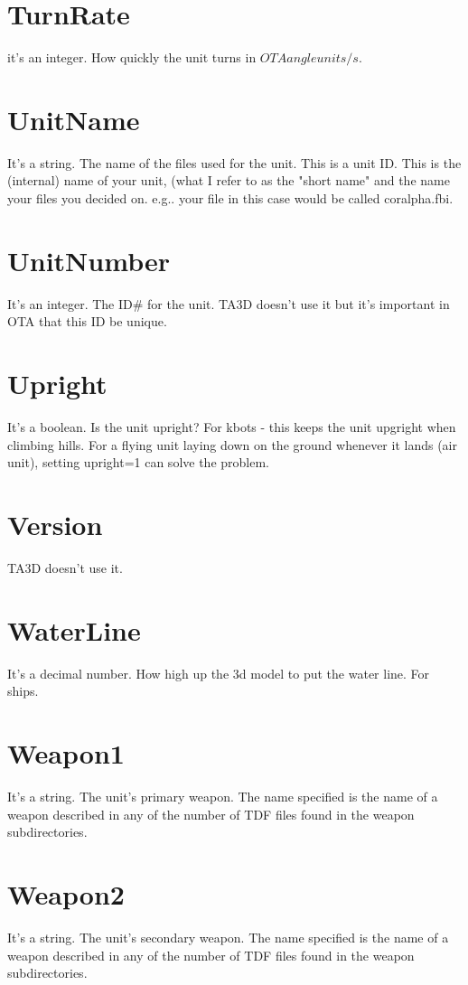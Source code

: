 \documentclass[a4paper,10pt]{article}
\begin{document}
\section{TurnRate}
it's an integer. How quickly the unit turns in $OTA angle units/s$.

\section{UnitName}
It's a string. The name of the files used for the unit. This is a unit ID. This is the (internal) name of your unit, (what I refer to as the "short name" and the name your files you decided on. e.g.. your file in this case would be called coralpha.fbi.

\section{UnitNumber}
It's an integer. The ID\# for the unit. TA3D doesn't use it but it's important in OTA that this ID be unique.

\section{Upright}
It's a boolean. Is the unit upright? For kbots - this keeps the unit upgright when climbing hills. For a flying unit laying down on the ground whenever it lands (air unit), setting upright=1 can solve the problem.

\section{Version}
TA3D doesn't use it.

\section{WaterLine}
It's a decimal number. How high up the 3d model to put the water line. For ships.

\section{Weapon1}
It's a string. The unit's primary weapon. The name specified is the name of a weapon described in any of the number of TDF files found in the weapon subdirectories.

\section{Weapon2}
It's a string. The unit's secondary weapon. The name specified is the name of a weapon described in any of the number of TDF files found in the weapon subdirectories.
\end{document}
